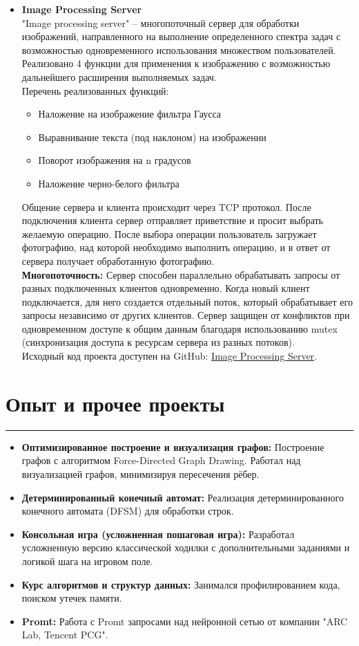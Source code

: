 \documentclass[a4paper,14pt]{article}
\begin{document}
\begin{itemize}
\item \textbf{Image Processing Server} \\
"Image processing server" – многопоточный сервер для обработки изображений, направленного на выполнение определенного
спектра задач с возможностью одновременного использования множеством пользователей.
Реализовано 4 функции для применения к изображению с возможностью дальнейшего расширения выполняемых задач. \\
Перечень реализованных функций:
\begin{itemize}
    \item Наложение на изображение фильтра Гаусса
    \item Выравнивание текста (под наклоном) на изображении
    \item Поворот изображения на n градусов
    \item Наложение черно-белого фильтра
\end{itemize}
Общение сервера и клиента происходит через TCP протокол.
После подключения клиента сервер отправляет приветствие и просит выбрать желаемую операцию.
После выбора операции пользователь загружает фотографию, над которой необходимо выполнить операцию,
и в ответ от сервера получает обработанную фотографию. \\
\textbf{Многопоточность:} Сервер способен параллельно обрабатывать запросы от разных подключенных клиентов одновременно.
Когда новый клиент подключается, для него создается отдельный поток, который обрабатывает его запросы независимо от других клиентов.
Сервер защищен от конфликтов при одновременном доступе к общим данным благодаря использованию mutex
(синхронизация доступа к ресурсам сервера из разных потоков).\\
Исходный код проекта доступен на GitHub:
\href{https://github.com/Denigmma/Cpp-course/tree/main/Server_lab5}{Image Processing Server}.
\end{itemize}


\section*{Опыт и прочее проекты}
\hrule
\vspace{0.5em}
\begin{itemize}
    \item \textbf{Оптимизированное построение и визуализация графов:} Построение графов с алгоритмом Force-Directed Graph Drawing. Работал над визуализацией графов, минимизируя пересечения рёбер.
    \item \textbf{Детерминированный конечный автомат:}
    Реализация детерминированного конечного автомата (DFSM) для обработки строк.
    \item \textbf{Консольная игра (усложненная пошаговая игра):} Разработал усложненную версию классической ходилки с дополнительными заданиями и логикой шага на игровом поле.
    \item \textbf{Курс алгоритмов и структур данных:} Занимался профилированием кода, поиском утечек памяти.
    \item \textbf{Promt:} Работа с Promt запросами над нейронной сетью от компании "ARC Lab, Tencent PCG".
\end{itemize}
\end{document}
